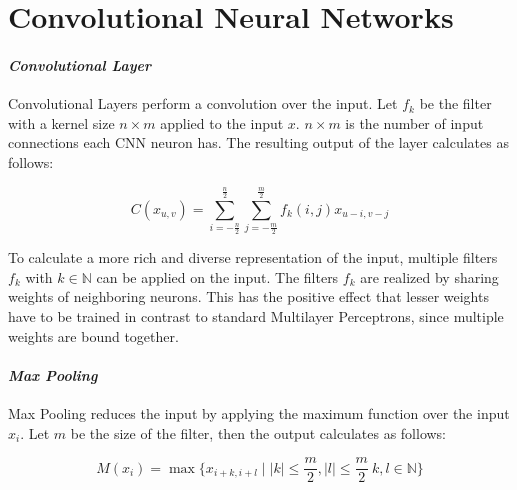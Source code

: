 \section{Convolutional Neural Networks}
\label{sec:background}

\paraV
\paragraph{\textit{Convolutional Layer}}
Convolutional Layers perform a convolution over the input. Let $f_k$ be the filter with a kernel size $n\times m$ applied to the input $x$. $n \times m$ is the number of input connections each CNN neuron has. The resulting output of the layer calculates as follows: 

\begin{center}
\begin{minipage}{0.8\columnwidth}
\begin{equation}
C(x_{u,v}) = \sum_{i=-\frac{n}{2}}^{\frac{n}{2}}\sum_{j=-\frac{m}{2}}^{\frac{m}{2}}f_k(i,j) x_{u-i,v-j}
\end{equation}
\end{minipage}
\end{center}

To calculate a more rich and diverse representation of the input, multiple filters $f_k$ with $k \in \mathbb{N}$ can be applied on the input. The filters $f_k$ are realized by sharing weights of neighboring neurons. This has the positive effect that lesser weights have to be trained in contrast to standard Multilayer Perceptrons, since multiple weights are bound together.



\paraV
\paragraph{\textit{Max Pooling}}

Max Pooling reduces the input by applying the maximum function over the input $x_i$. Let $m$ be the size of the filter, then the output calculates as follows:


\begin{center}
\begin{minipage}{1\columnwidth}
\begin{equation}
M(x_i) = \max\{x_{i+k, i+l} \mid |k| \leq \frac{m}{2}, |l| \leq \frac{m}{2}\ k,l \in \mathbb{N}\}
\end{equation}
\end{minipage}
\end{center}

